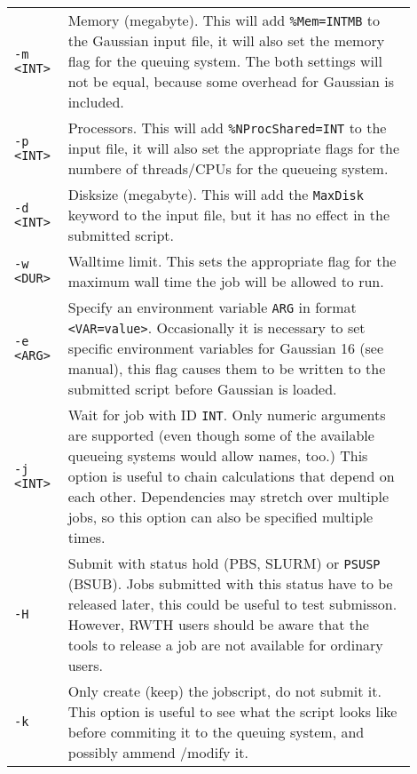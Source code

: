 \documentclass[   %
  final,          %
  a4paper         %
]{article}
\begin{document}
\begin{longtable}{p{0.1\linewidth}p{0.8\linewidth}}
  {\lstinline`-m <INT>`} & Memory (megabyte).\newline 
    This will add \texttt{\%Mem={\lstinline`INT`}MB} to the Gaussian input file,
    it will also set the memory flag for the queuing system. 
    The both settings will not be equal, because some overhead for Gaussian is included. \\
  {\lstinline`-p <INT>`} & Processors.\newline 
    This will add \texttt{\%NProcShared={\lstinline`INT`}} to the input file,
    it will also set the appropriate flags for the numbere of threads/CPUs for the queueing system. \\
  {\lstinline`-d <INT>`} & Disksize (megabyte).\newline 
    This will add the \texttt{MaxDisk} keyword to the input file, but it has no effect in the submitted script. \\
  {\lstinline`-w <DUR>`} & Walltime limit. 
    This sets the appropriate flag for the maximum wall time the job will be allowed to run. \\
  {\lstinline`-e <ARG>`} & Specify an environment variable {\lstinline`ARG`} in format {\lstinline`<VAR=value>`}.
    Occasionally it is necessary to set specific environment variables for Gaussian 16 (see manual),
    this flag causes them to be written to the submitted script before Gaussian is loaded. \\
  {\lstinline`-j <INT>`} & Wait for job with ID {\lstinline`INT`}.
    Only numeric arguments are supported (even though some of the available queueing systems would allow names, too.)
    This option is useful to chain calculations that depend on each other. 
    Dependencies may stretch over multiple jobs, so this option can also be specified multiple times.\\
  {\lstinline`-H`}       & Submit with status hold (PBS, SLURM) or \texttt{PSUSP} (BSUB).
    Jobs submitted with this status have to be released later, this could be useful to test submisson.
    However, RWTH users should be aware that the tools to release a job are not available for ordinary users. \\
  {\lstinline`-k`}       & Only create (keep) the jobscript, do not submit it. 
    This option is useful to see what the script looks like before commiting it to the queuing system,
    and possibly ammend /modify it. 

\end{longtable}
\end{document}
